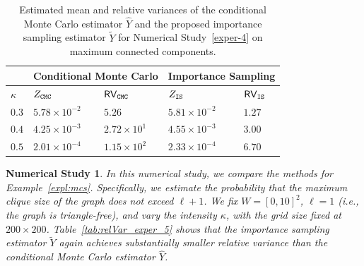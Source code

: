 \documentclass[pdflatex, sn-mathphys-ay]{sn-jnl}%
\newcommand{\wt}{\widetilde}
\newcommand{\wh}{\widehat}
\newtheorem{experiment}{Numerical Study}
\theoremstyle{thmstyleone}%
\theoremstyle{thmstyletwo}%
\theoremstyle{thmstylethree}%
\begin{document}
\begin{table}[h]
 
\caption{Estimated mean and relative variances of the conditional Monte Carlo estimator $\wh Y$ and the proposed importance sampling estimator $\wt Y$ for Numerical Study~\ref{exper-4} on maximum connected components.}
\label{tab:relVar_exper_4}
\centering
\begin{tabular}{@{}lllll@{}}
    \hline
      & \multicolumn{2}{l}{Conditional Monte Carlo}
            & \multicolumn{2}{l}{Importance Sampling} \\
    \hline
     $\kappa$  &  $Z_{\tt CMC}$  &  ${\sf RV}_{\tt CMC}$   &   $Z_{\tt IS}$  &  ${\sf RV}_{\tt IS}$ \\
    \hline
$0.3$  &  $5.78 \times 10^{-2}$  &  $5.26$  &  $5.81 \times 10^{-2}$  &  $1.27$  \\
    \hline
$0.4$  &  $4.25 \times 10^{-3}$  &  $2.72\times 10^{1}$  &  $4.55 \times 10^{-3}$  &  $3.00$  \\
    \hline
$0.5$  &  $2.01 \times 10^{-4}$  &  $1.15 \times 10^{2}$  &  $2.33 \times 10^{-4}$  &  $6.70$  \\
    \hline
\end{tabular}
\end{table}

\begin{experiment}
 
\label{exper-5}
\normalfont
In this numerical study, we compare the methods for Example~\ref{expl:mcs}. Specifically, we estimate the probability that the maximum clique size of the graph does not exceed $\ell + 1$. We fix $W = [0, 10]^2$, $\ell = 1$ (i.e., the graph is triangle-free), and vary the intensity $\kappa$, with the grid size fixed at $200 \times 200$. Table~\ref{tab:relVar_exper_5} shows that the importance sampling estimator $\wt Y$ again achieves substantially smaller relative variance than the conditional Monte Carlo estimator $\wh Y$. 
\end{experiment}
\end{document}
